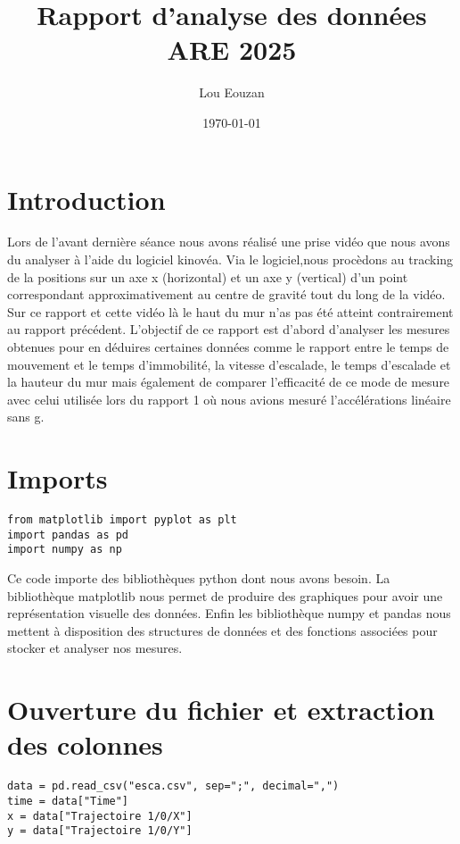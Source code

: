 \documentclass[11pt]{article}
\author{Lou Eouzan}
\date{\today}
\title{Rapport d'analyse des données ARE 2025}
\begin{document}
\maketitle
\tableofcontents

\section{Introduction}
\label{sec:org3568ebd}

Lors de l'avant dernière séance nous avons réalisé une prise vidéo que nous avons du analyser à l'aide du logiciel kinovéa. Via le logiciel,nous
procèdons au tracking de la positions sur un axe x (horizontal) et un axe y (vertical) d'un point correspondant approximativement au centre de gravité
tout du long de la vidéo. Sur ce rapport et cette vidéo là le haut du mur n'as pas été atteint contrairement au rapport précédent. L'objectif de ce
rapport est d'abord d'analyser les mesures obtenues pour en déduires certaines données comme le rapport entre le temps de mouvement et le temps
d’immobilité, la vitesse d'escalade, le temps d'escalade et la hauteur du mur mais également de comparer l'efficacité de ce mode de mesure avec celui
utilisée lors du rapport 1 où nous avions mesuré l'accélérations linéaire sans g.
\section{Imports}
\label{sec:orgabb9803}

\begin{verbatim}
from matplotlib import pyplot as plt
import pandas as pd
import numpy as np
\end{verbatim}

Ce code importe des bibliothèques python dont nous avons besoin. La bibliothèque matplotlib nous permet de produire des graphiques pour avoir une
représentation visuelle des données. Enfin les bibliothèque numpy et pandas nous mettent à disposition des structures de données et des fonctions
associées pour stocker et analyser nos mesures.
\section{Ouverture du fichier et extraction des colonnes}
\label{sec:org68b4c91}

\begin{verbatim}
data = pd.read_csv("esca.csv", sep=";", decimal=",") 
time = data["Time"]
x = data["Trajectoire 1/0/X"]
y = data["Trajectoire 1/0/Y"]
\end{verbatim}
\end{document}
